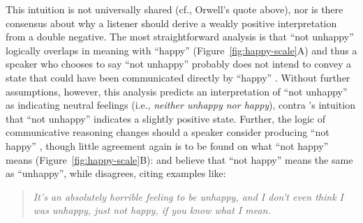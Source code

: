 \documentclass[floatsintext,doc]{apa6}
\begin{document}
This intuition is not universally shared (cf., Orwell's quote above), nor is there consensus about why a listener should derive a weakly positive interpretation from a double negative.
The most straightforward analysis is that \enquote{not unhappy}  logically overlaps in meaning with \enquote{happy} (Figure~\ref{fig:happy-scale}A) and thus a speaker who chooses to say \enquote{not unhappy} probably does not intend to convey a state that could have been communicated directly by \enquote{happy} \cite{Horn1991:Duplex}. 
Without further assumptions, however, this analysis predicts an interpretation of \enquote{not unhappy} as indicating neutral feelings (i.e., \emph{neither unhappy nor happy}), contra 's intuition that \enquote{not unhappy} indicates a slightly positive state.
Further, the logic of communicative reasoning changes should a speaker consider producing \enquote{not happy} \cite{Blutner2004:pragmatics}, though little agreement again is to be found on what \enquote{not happy} means (Figure~\ref{fig:happy-scale}B):  and  believe that \enquote{not happy} means the same as \enquote{unhappy}, while  disagrees, citing examples like:

\begin{quote}
\emph{It's an absolutely horrible feeling to be unhappy, and I don't even think I was unhappy, just not happy, if you know what I mean.} %
\end{quote}

%
%
%
%
\end{document}
